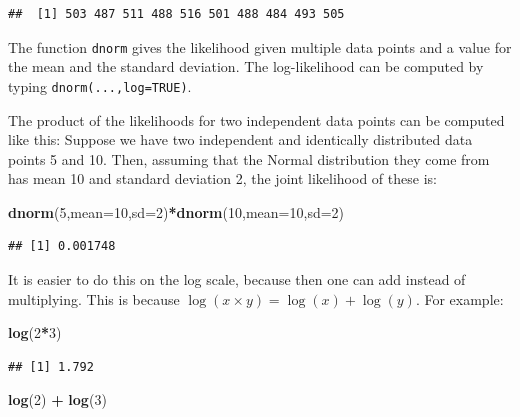 \documentclass[12pt,]{krantz}
\newenvironment{Shaded}{\begin{snugshade}}{\end{snugshade}}
\newcommand{\DataTypeTok}[1]{\textcolor[rgb]{0.13,0.29,0.53}{#1}}
\newcommand{\DecValTok}[1]{\textcolor[rgb]{0.00,0.00,0.81}{#1}}
\newcommand{\KeywordTok}[1]{\textcolor[rgb]{0.13,0.29,0.53}{\textbf{#1}}}
\newcommand{\NormalTok}[1]{#1}
\newcommand{\OperatorTok}[1]{\textcolor[rgb]{0.81,0.36,0.00}{\textbf{#1}}}
\newcommand{\StringTok}[1]{\textcolor[rgb]{0.31,0.60,0.02}{#1}}
\begin{document}
\begin{verbatim}
##  [1] 503 487 511 488 516 501 488 484 493 505
\end{verbatim}

The function \texttt{dnorm} gives the likelihood given multiple data points and a value for the mean and the standard deviation. The log-likelihood can be computed by typing \texttt{dnorm(...,log=TRUE)}.

The product of the likelihoods for two independent data points can be computed like this: Suppose we have two independent and identically distributed data points 5 and 10. Then, assuming that the Normal distribution they come from has mean 10 and standard deviation 2, the joint likelihood of these is:

\begin{Shaded}
\begin{Highlighting}[]
\KeywordTok{dnorm}\NormalTok{(}\DecValTok{5}\NormalTok{,}\DataTypeTok{mean=}\DecValTok{10}\NormalTok{,}\DataTypeTok{sd=}\DecValTok{2}\NormalTok{)}\OperatorTok{*}\KeywordTok{dnorm}\NormalTok{(}\DecValTok{10}\NormalTok{,}\DataTypeTok{mean=}\DecValTok{10}\NormalTok{,}\DataTypeTok{sd=}\DecValTok{2}\NormalTok{)}
\end{Highlighting}
\end{Shaded}

\begin{verbatim}
## [1] 0.001748
\end{verbatim}

It is easier to do this on the log scale, because then one can add instead of multiplying. This is because \(\log(x\times y)= \log(x) + \log(y)\). For example:

\begin{Shaded}
\begin{Highlighting}[]
\KeywordTok{log}\NormalTok{(}\DecValTok{2}\OperatorTok{*}\DecValTok{3}\NormalTok{)}
\end{Highlighting}
\end{Shaded}

\begin{verbatim}
## [1] 1.792
\end{verbatim}

\begin{Shaded}
\begin{Highlighting}[]
\KeywordTok{log}\NormalTok{(}\DecValTok{2}\NormalTok{) }\OperatorTok{+}\StringTok{ }\KeywordTok{log}\NormalTok{(}\DecValTok{3}\NormalTok{)}
\end{Highlighting}
\end{Shaded}
\end{document}
